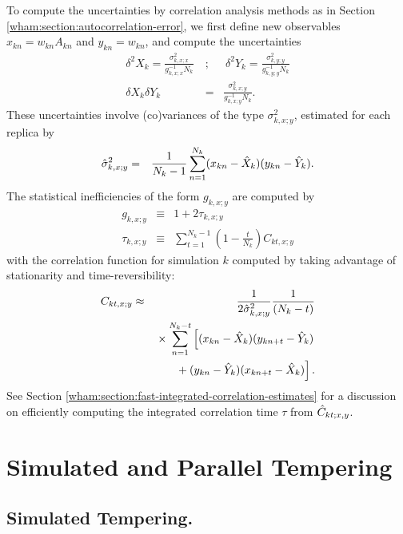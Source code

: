 To compute the uncertainties by correlation analysis methods as in Section \ref{wham:section:autocorrelation-error}, we first define new observables $x_{kn} = w_{kn} A_{kn}$ and $y_{kn} = w_{kn}$, and compute the uncertainties
\begin{eqnarray}
\delta^2 X_k = \frac{\sigma^2_{k, x;x}}{g_{k,x;x}^{-1} N_k} \: &;& \: \delta^2 Y_k = \frac{\sigma^2_{k, y;y}}{g_{k, y;y}^{-1} N_k} \nonumber \\
\delta X_k \delta Y_k &=& \frac{\sigma^2_{k, x;y}}{g_{k,x;y}^{-1} N_k} \label{wham:equation:canonical-numerator-uncertainties} .
\end{eqnarray}
These uncertainties involve (co)variances of the type $\sigma^2_{k, x;y}$, estimated for each replica by
\begin{eqnarray}
\hat{\sigma}^2_{k,x;y} &=& \frac{1}{N_k-1} \sum_{n=1}^{N_k} (x_{kn} - \hat{X}_k) (y_{kn} - \hat{Y}_k).
\end{eqnarray}
The statistical inefficiencies of the form $g_{k,x;y}$ are computed by
\begin{eqnarray}
g_{k,x;y} &\equiv& 1 + 2 \tau_{k,x;y} \\
\tau_{k,x;y} &\equiv& \sum_{t=1}^{N_k-1} \left(1 - \frac{t}{N_k}\right) C_{kt,x;y}
\end{eqnarray}
with the correlation function for simulation $k$ computed by taking advantage of stationarity and time-reversibility:
\begin{eqnarray}
C_{kt,x;y} &\approx& \frac{1}{2 \hat{\sigma}^2_{k,x;y}} \frac{1}{(N_k - t)} \nonumber \\ 
&& \mbox{} \times \sum_{n=1}^{N_k-t} \left[ (x_{kn} - \hat{X}_k) (y_{k n+t} - \hat{Y}_k) \right. \nonumber \\
&& \left. \mbox{} + (y_{kn} - \hat{Y}_k) (x_{k n+t} - \hat{X}_k) \right]. \label{wham:equation:canonical-correlation-functions}
\end{eqnarray}
See Section \ref{wham:section:fast-integrated-correlation-estimates} for a discussion on efficiently computing the integrated correlation time $\tau$ from $\hat{C}_{kt;x,y}$.

\section{Simulated and Parallel Tempering}
\label{wham:section:simulated-and-parallel-tempering}

\subsection{Simulated Tempering.}
\label{wham:section:simulated-tempering}


